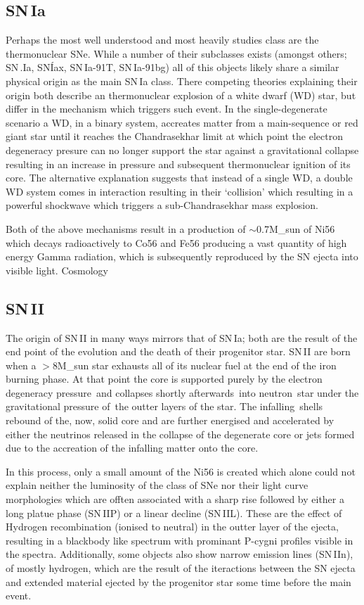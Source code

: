 \subsection{SN\,Ia}
Perhaps the most well understood and most heavily studies class are the thermonuclear SNe. While a number of their subclasses exists (amongst others; SN\,.Ia, SN\'Iax, SN\,Ia-91T, SN\,Ia-91bg) all of this objects likely share a similar physical origin as the main SN\,Ia class. There competing theories explaining their origin both describe an thermonuclear explosion of a white dwarf (WD) star, but differ in the mechanism which triggers such event. In the single-degenerate scenario a WD, in a binary system, accreates matter from a main-sequence or red giant star until it reaches the Chandrasekhar limit at which point the electron degeneracy presure can no longer support the star against a gravitational collapse resulting in an increase in pressure and subsequent thermonuclear ignition of its core. The alternative explanation suggests that instead of a single WD, a double WD system comes in interaction resulting in their `collision' which resulting in a powerful shockwave which triggers a sub-Chandrasekhar mass explosion.

Both of the above mechanisms result in a production of $\sim$0.7M_sun of Ni56 which decays radioactively to Co56 and Fe56 producing a vast quantity of high energy Gamma radiation, which is subsequently reproduced by the SN ejecta into visible light. Cosmology


\subsection{SN\,II}
The origin of SN\,II in many ways mirrors that of SN\,Ia; both are the result of the end point of the evolution and the death of their progenitor star. SN\,II are born when a $>$8M_sun star exhausts all of its nuclear fuel at the end of the iron burning phase. At that point the core is supported purely by the electron degeneracy pressure and collapses shortly afterwards into neutron star under the gravitational pressure of the outter layers of the star. The infalling shells rebound of the, now, solid core and are further energised and accelerated by either the neutrinos released in the collapse of the degenerate core or jets formed due to the accreation of the infalling matter onto the core.

In this process, only a small amount of the Ni56 is created which alone could not explain neither the luminosity of the class of SNe nor their light curve morphologies which are offten associated with a sharp rise followed by either a long platue phase (SN\,IIP) or a linear decline (SN\,IIL). These are the effect of Hydrogen recombination (ionised to neutral) in the outter layer of the ejecta, resulting in a blackbody like spectrum with prominant P-cygni profiles visible in the spectra. Additionally, some objects also show narrow emission lines (SN\,IIn), of mostly hydrogen, which are the result of the iteractions between the SN ejecta and extended material ejected by the progenitor star some time before the main event.

